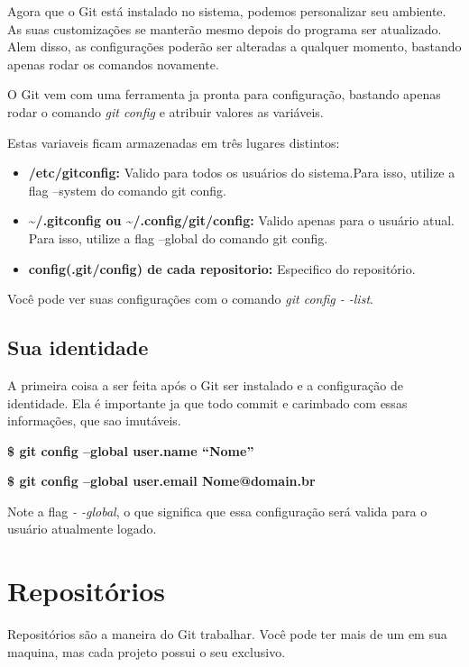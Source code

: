 \documentclass[]{article}
\begin{document}
Agora que o Git está instalado no sistema, podemos personalizar seu ambiente. 
As suas customizações se manterão mesmo depois do programa ser atualizado. 
Alem disso, as configurações poderão ser alteradas a qualquer momento, bastando apenas rodar os comandos novamente. 


O Git vem com uma ferramenta ja pronta para configuração, bastando apenas rodar o comando \textit{git config} e atribuir valores as variáveis.


Estas variaveis ficam armazenadas em três lugares distintos:


\begin{itemize}
    \item {\textbf{/etc/gitconfig:} } Valido para todos os usuários do sistema.Para isso, utilize a flag --system do comando git config.
    
    \item {\textbf{\textasciitilde/.gitconfig ou \textasciitilde/.config/git/config:} } Valido apenas para o usuário atual. Para isso, utilize a flag --global do comando git config.
    
    \item {\textbf{config(.git/config) de  cada repositorio:} } Especifico  do repositório.
\end{itemize}
Você pode ver suas configurações com o comando \textit{git config - -list}.

\subsection*{Sua identidade}
A primeira coisa a ser feita  após o Git ser instalado e a configuração de identidade.
 Ela é importante ja que todo commit e carimbado com essas informações, que sao imutáveis.

\textbf{\$ git config --global user.name ``Nome'' }

\textbf{\$ git config --global user.email Nome@domain.br}

Note a flag \textit{- -global}, o que significa que essa configuração será valida para o usuário atualmente logado.

\section{Repositórios}

Repositórios são a maneira do Git  trabalhar. Você pode ter mais de um em sua maquina, mas cada projeto possui o seu exclusivo.
\end{document}
